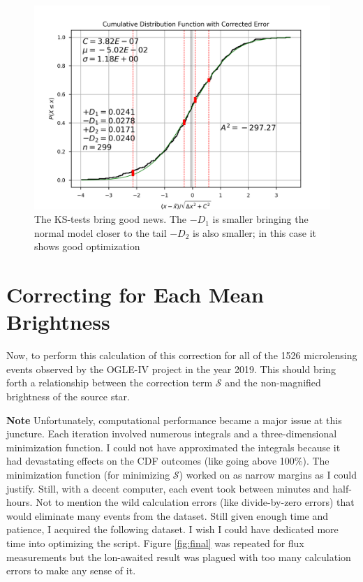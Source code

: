 \documentclass[12pt, a4paper]{article}
\begin{document}
\begin{figure}[H]
\centering
\includegraphics[width=\textwidth]{gauss_ec}
\caption{The KS-tests bring good news.
  The $-D_1$ is smaller bringing the normal model closer to the tail
  $-D_2$ is also smaller; in this case it shows good optimization
}
\label{ref:gauss_ec}
\end{figure}


\section{Correcting for Each Mean Brightness}

Now, to perform this calculation of this correction for all of the 1526 microlensing events observed by the OGLE-IV project in the year 2019. This should bring forth a relationship between the correction term $\mathcal S$ and the non-magnified brightness of the source star.

\par \noindent \textbf{Note}\newline
Unfortunately, computational performance became a major issue at this juncture.
Each iteration involved numerous integrals and a three-dimensional minimization function.
I could not have approximated the integrals because it had devastating effects on the CDF outcomes (like going above 100\%).
The minimization function (for minimizing $\mathcal{S}$) worked on as narrow margins as I could justify.
Still, with a decent computer, each event took between minutes and half-hours.
Not to mention the wild calculation errors (like divide-by-zero errors) that would eliminate many events from the dataset.
Still given enough time and patience, I acquired the following dataset.
I wish I could have dedicated more time into optimizing the script.
Figure \ref{fig:final} was repeated for flux measurements but the lon-awaited result was plagued with too many calculation errors to make any sense of it.
\end{document}
